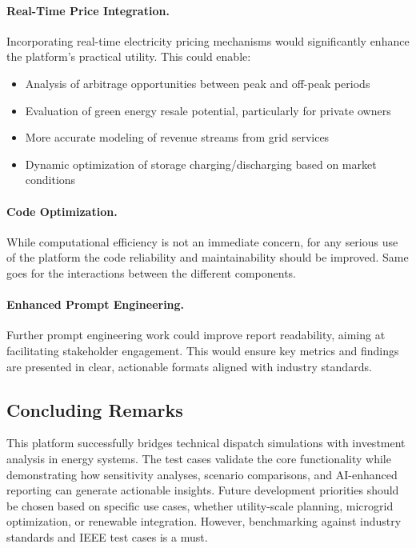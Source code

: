 \paragraph{Real-Time Price Integration.}
Incorporating real-time electricity pricing mechanisms would significantly enhance the platform's practical utility. This could enable:

\begin{itemize}
    \item Analysis of arbitrage opportunities between peak and off-peak periods
    \item Evaluation of green energy resale potential, particularly for private owners 
    \item More accurate modeling of revenue streams from grid services
    \item Dynamic optimization of storage charging/discharging based on market conditions
\end{itemize}

\paragraph{Code Optimization.}
While computational efficiency is not an immediate concern, for any serious 
use of the platform the code reliability and maintainability should be improved. Same goes for the interactions 
between the different components.

\paragraph{Enhanced Prompt Engineering.}
Further prompt engineering work could improve report readability, 
aiming at facilitating stakeholder engagement. This would ensure key metrics and findings are presented in clear, 
actionable formats aligned with industry standards.


\subsection{Concluding Remarks}
This platform successfully bridges technical dispatch simulations with investment analysis in energy systems. 
The test cases validate the core functionality while demonstrating how sensitivity analyses, scenario comparisons, 
and AI-enhanced reporting can generate actionable insights. Future development priorities should be chosen based 
on specific use cases, whether utility-scale planning, microgrid optimization, or renewable integration. However,
benchmarking against industry standards and IEEE test cases is a must.